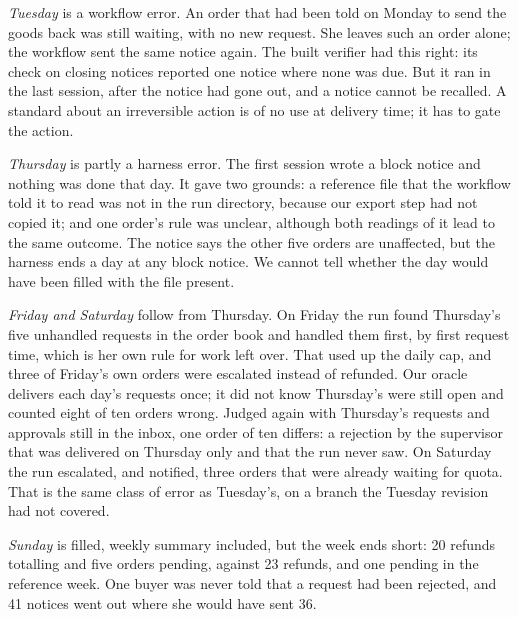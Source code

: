 \documentclass[10pt]{article}
\begin{document}
\emph{Tuesday} is a workflow error. An order that had been told on Monday to send the goods back was still
waiting, with no new request. She leaves such an order alone; the workflow sent the same notice again. The built
verifier had this right: its check on closing notices reported one notice where none was due. But it ran in the
last session, after the notice had gone out, and a notice cannot be recalled. A standard about an irreversible
action is of no use at delivery time; it has to gate the action.

\emph{Thursday} is partly a harness error. The first session wrote a block notice and nothing was done that day.
It gave two grounds: a reference file that the workflow told it to read was not in the run directory, because our
export step had not copied it; and one order's rule was unclear, although both readings of it lead to the same
outcome. The notice says the other five orders are unaffected, but the harness ends a day at any block notice. We
cannot tell whether the day would have been filled with the file present.

\emph{Friday and Saturday} follow from Thursday. On Friday the run found Thursday's five unhandled requests in
the order book and handled them first, by first request time, which is her own rule for work left over. That
used up the daily cap, and three of Friday's own orders were escalated instead of refunded. Our oracle delivers
each day's requests once; it did not know Thursday's were still open and counted eight of ten orders wrong.
Judged again with Thursday's requests and approvals still in the inbox, one order of ten differs: a rejection by
the supervisor that was delivered on Thursday only and that the run never saw. On Saturday the run escalated,
and notified, three orders that were already waiting for quota. That is the same class of error as Tuesday's, on
a branch the Tuesday revision had not covered.

\emph{Sunday} is filled, weekly summary included, but the week ends short: 20 refunds totalling 
and five orders pending, against 23 refunds,  and one pending in the reference week. One buyer was
never told that a request had been rejected, and 41 notices went out where she would have sent 36.
\end{document}
